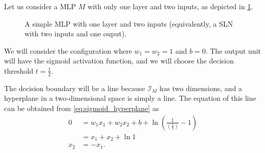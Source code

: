 \begin{example}
    \label{ex:sln_2_in_1_out_sigmoid_hyperplane}
    Let us consider a MLP $M$ with only one layer and two inputs, as depicted in \ref{fig:sln_2_in_1_out}.
    \begin{figure}
        \begin{center}
        \end{center}
        \caption{A simple MLP with one layer and two inputs (equivalently, a SLN with two inputs and one ouput).}
        \label{fig:sln_2_in_1_out}
    \end{figure}
    We will consider the configuration where $w_1=w_2=1$ and $b=0$. 
    The output unit will have the sigmoid activation function, and we will choose the decision threshold $t=\frac{1}{2}$.
    
    The decision boundary will be a line because $\mathcal{I}_M$ has two dimensions, and a hyperplane in a two-dimensional space is simply a line.
    The equation of this line can be obtained from \ref{eq:sigmoid_hyperplane} as
    \begin{align*}
        0 &= w_1 x_1 + w_2 x_2 + b + \ln \left(\frac{1}{\left(\frac{1}{2}\right)} - 1\right) \\
        &= x_1 + x_2 + \ln 1 \\
        x_2 &= -x_1.
    \end{align*}


\end{example}
